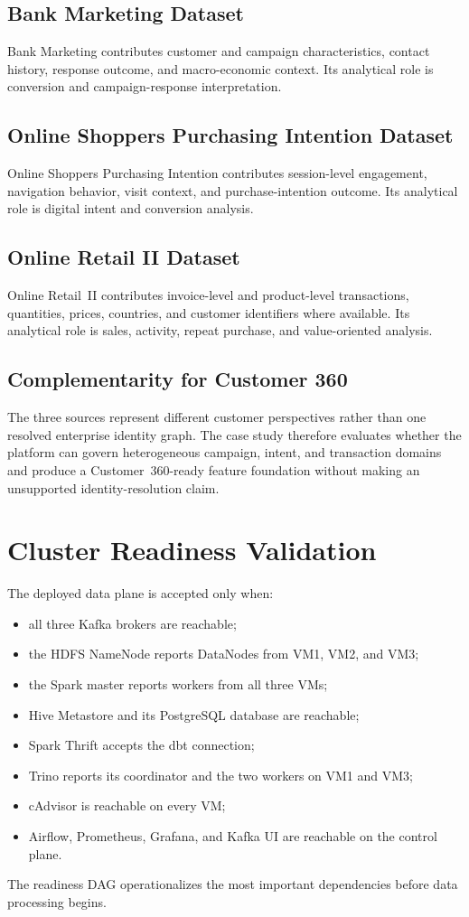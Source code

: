 \subsection{Bank Marketing Dataset}
Bank Marketing contributes customer and campaign characteristics, contact history, response outcome, and macro-economic context. Its analytical role is conversion and campaign-response interpretation.

\subsection{Online Shoppers Purchasing Intention Dataset}
Online Shoppers Purchasing Intention contributes session-level engagement, navigation behavior, visit context, and purchase-intention outcome. Its analytical role is digital intent and conversion analysis.

\subsection{Online Retail II Dataset}
Online Retail~II contributes invoice-level and product-level transactions, quantities, prices, countries, and customer identifiers where available. Its analytical role is sales, activity, repeat purchase, and value-oriented analysis.

\subsection{Complementarity for Customer 360}
The three sources represent different customer perspectives rather than one resolved enterprise identity graph. The case study therefore evaluates whether the platform can govern heterogeneous campaign, intent, and transaction domains and produce a Customer~360-ready feature foundation without making an unsupported identity-resolution claim.

\section{Cluster Readiness Validation}
The deployed data plane is accepted only when:
\begin{itemize}
    \item all three Kafka brokers are reachable;
    \item the HDFS NameNode reports DataNodes from VM1, VM2, and VM3;
    \item the Spark master reports workers from all three VMs;
    \item Hive Metastore and its PostgreSQL database are reachable;
    \item Spark Thrift accepts the dbt connection;
    \item Trino reports its coordinator and the two workers on VM1 and VM3;
    \item cAdvisor is reachable on every VM;
    \item Airflow, Prometheus, Grafana, and Kafka UI are reachable on the control plane.
\end{itemize}
The readiness DAG operationalizes the most important dependencies before data processing begins.

